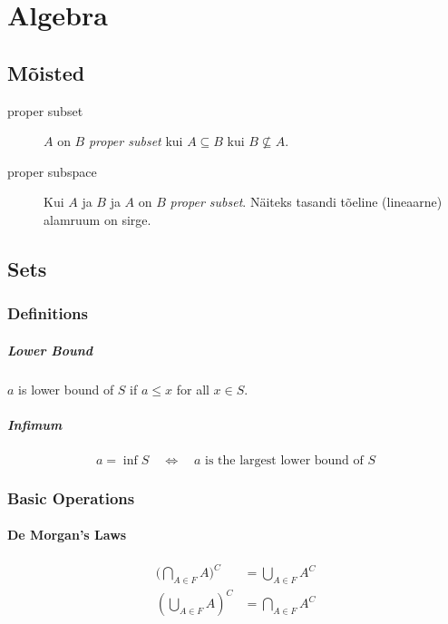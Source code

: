 \documentclass[a4paper]{article}
\numberwithin{equation}{subsection}
\begin{document}
\newpage
{}
\section{Algebra}

\subsection{Mõisted}
\label{sec:algebra_mqisted}

\begin{description}
\item[proper subset] $A$ on $B$ \emph{proper subset} kui $A\subseteq
  B$ kui $B \not\subseteq A$.
\item[proper subspace] Kui $A$ ja $B$ ja $A$ on $B$ \emph{proper
    subset}.  Näiteks tasandi tõeline (lineaarne) alamruum on sirge.
\end{description}


\subsection{Sets}

\subsubsection{Definitions}

\subparagraph{Lower Bound}

$a$ is lower bound of $S$ if $a \le x$ for all $x \in S$.

\subparagraph{Infimum}

\begin{equation}
  \label{eq:infimum}
  a = \inf S
  \quad
  \Leftrightarrow
  \quad
  \text{$a$ is the largest lower bound of $S$}
\end{equation}

\subsubsection{Basic Operations}
\label{sec:set_operations}

\paragraph{De Morgan's Laws}

\begin{align}
\big( \bigcap_{A \in F} A \big)^C & = 
  \bigcup_{A \in F} A^C
\\
\left( \bigcup_{A \in F} A \right)^C & = 
                                       \bigcap_{A \in F} A^C
\end{align}
\end{document}
